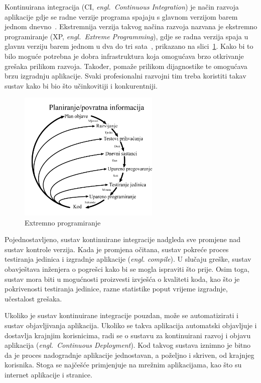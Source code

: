 Kontinuirana integracija (CI, \textit{engl.~Continuous Integration}) je način razvoja aplikacije
gdje se radne verzije programa spajaju s glavnom verzijom barem jednom
dnevno~\citep{fowler2006continuous}. Ekstremnija verzija takvog načina razvoja nazvana je ekstremno
programiranje (XP, \textit{engl.~Extreme Programming}), gdje se radna verzija spaja u glavnu verziju
barem jednom u dva do tri sata~\citep{beck1999embracing}, prikazano na slici~\ref{fig:02xp}. Kako bi
to bilo moguće potrebna je dobra infrastruktura koja omogućava brzo otkrivanje grešaka prilikom
razvoja. Također, pomaže prilikom dijagnostike te omogućava brzu izgradnju aplikacije. Svaki
profesionalni razvojni tim treba koristiti takav sustav kako bi bio što učinkovitiji i
konkurentniji.

\begin{figure}[h]
    \centering
    \includegraphics[width=0.6\textwidth]{img/02/xp.png}
    \caption{Extremno programiranje}
    \label{fig:02xp}
\end{figure}

Pojednostavljeno, sustav kontinuirane integracije nadgleda sve promjene nad sustav kontrole verzija.
Kada je promjena očitana, sustav pokreće proces testiranja jedinica i izgradnje aplikacije
(\textit{engl. compile}). U slučaju greške, sustav obavještava inženjera o pogrešci kako bi se mogla
ispraviti što prije. Osim toga, sustav mora biti u mogućnosti proizvesti izvješća o kvaliteti koda,
kao što je pokrivenosti testiranja jedinice, razne statistike poput vrijeme izgradnje, učestalost
grešaka.

Ukoliko je sustav kontinuirane integracije pouzdan, može se automatizirati i sustav objavljivanja
aplikacija. Ukoliko se takva aplikacija automatski objavljuje i dostavlja krajnjim korisnicima, radi
se o sustavu za kontinuirani razvoj i objavu aplikacija (\textit{engl.~Continuous Deployment}). Kod
takvog sustava iznimno je bitno da je proces nadogradnje aplikacije jednostavan, a poželjno i
skriven, od krajnjeg korisnika. Stoga se najčešće primjenjuje na mrežnim aplikacijama, kao što su
internet aplikacije i stranice.

